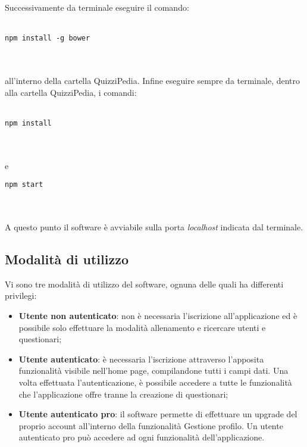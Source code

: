 Successivamente da terminale eseguire il comando:\\
\\
\centerline{\texttt{npm install -g bower}}\\
\\
all'interno della cartella QuizziPedia. Infine eseguire sempre da terminale, dentro alla cartella QuizziPedia, i comandi:\\
\\
\centerline{\texttt{npm install}}\\
\\
e
\\
\centerline{\texttt{npm start}}\\
\\
A questo punto il software è avviabile sulla porta \textit{localhost} indicata dal terminale.

\subsection{Modalità di utilizzo}
Vi sono tre modalità di utilizzo del software, ognuna delle quali ha differenti privilegi:
\begin{itemize}
	\item \textbf{Utente non autenticato}: non è necessaria l'iscrizione all'applicazione ed è possibile solo effettuare la modalità allenamento e ricercare utenti e questionari;
	\item \textbf{Utente autenticato}: è necessaria l'iscrizione attraverso l'apposita funzionalità visibile nell'home page, compilandone tutti i campi dati. Una volta effettuata l'autenticazione, è possibile accedere a tutte le funzionalità che l'applicazione offre tranne la creazione di questionari;
	\item \textbf{Utente autenticato pro}: il software permette di effettuare un upgrade del proprio account all'interno della funzionalità Gestione profilo. Un utente autenticato pro può accedere ad ogni funzionalità dell'applicazione. 
\end{itemize}

